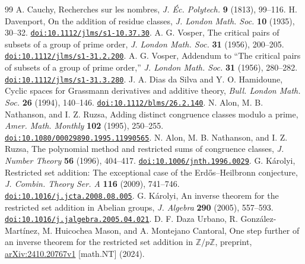 \documentclass[12pt]{article}
\theoremstyle{remark}
\begin{document}
\begin{thebibliography}{99}
\fontsize{10}{12}\selectfont
\setlength{\itemsep}{0pt}
\setlength{\parsep}{0pt}
\setlength{\parskip}{0pt}
A. Cauchy, Recherches sur les nombres,
\emph{J. \'Ec. Polytech.} \textbf{9} (1813), 99--116.
H. Davenport, On the addition of residue classes,
\emph{J. London Math. Soc.} \textbf{10} (1935), 30--32.
\href{https://doi.org/10.1112/jlms/s1-10.37.30}{\nolinkurl{doi:10.1112/jlms/s1-10.37.30}}.
A. G. Vosper, The critical pairs of subsets of a group of prime order,
\emph{J. London Math. Soc.} \textbf{31} (1956), 200--205.
\href{https://doi.org/10.1112/jlms/s1-31.2.200}{\nolinkurl{doi:10.1112/jlms/s1-31.2.200}}.
A. G. Vosper, Addendum to ``The critical pairs of subsets of a group of
prime order,'' \emph{J. London Math. Soc.} \textbf{31} (1956), 280--282.
\href{https://doi.org/10.1112/jlms/s1-31.3.280}{\nolinkurl{doi:10.1112/jlms/s1-31.3.280}}.
J. A. Dias da Silva and Y. O. Hamidoune, Cyclic spaces for Grassmann
derivatives and additive theory, \emph{Bull. London Math. Soc.}
\textbf{26} (1994), 140--146.
\href{https://doi.org/10.1112/blms/26.2.140}{\nolinkurl{doi:10.1112/blms/26.2.140}}.
N. Alon, M. B. Nathanson, and I. Z. Ruzsa, Adding distinct congruence
classes modulo a prime, \emph{Amer. Math. Monthly} \textbf{102} (1995), 250--255.
\href{https://doi.org/10.1080/00029890.1995.11990565}{\nolinkurl{doi:10.1080/00029890.1995.11990565}}.
N. Alon, M. B. Nathanson, and I. Z. Ruzsa, The polynomial method and
restricted sums of congruence classes, \emph{J. Number Theory}
\textbf{56} (1996), 404--417.
\href{https://doi.org/10.1006/jnth.1996.0029}{\nolinkurl{doi:10.1006/jnth.1996.0029}}.
G. K\'arolyi, Restricted set addition: The exceptional case of the
Erd\H{o}s--Heilbronn conjecture, \emph{J. Combin. Theory Ser. A}
\textbf{116} (2009), 741--746.
\href{https://doi.org/10.1016/j.jcta.2008.08.005}{\nolinkurl{doi:10.1016/j.jcta.2008.08.005}}.
G. K\'arolyi, An inverse theorem for the restricted set addition in
Abelian groups, \emph{J. Algebra} \textbf{290} (2005), 557--593.
\href{https://doi.org/10.1016/j.jalgebra.2005.04.021}{\nolinkurl{doi:10.1016/j.jalgebra.2005.04.021}}.
D. F. Daza Urbano, R. Gonz\'alez-Mart\'inez, M. Huicochea Mason, and
A. Montejano Cantoral, One step further of an inverse theorem for the
restricted set addition in $\mathbb Z/p\mathbb Z$, preprint,
\href{https://arxiv.org/abs/2410.20767v1}{arXiv:2410.20767v1} [math.NT] (2024).

\end{thebibliography}
\end{document}
